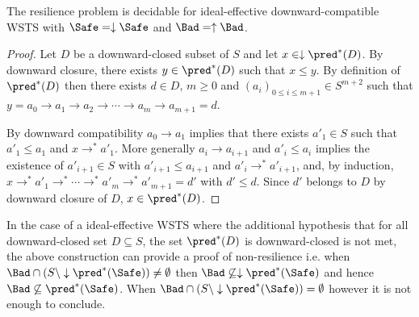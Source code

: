 \begin{corollary}
The resilience problem is decidable for ideal-effective downward-compatible WSTS with 
$\Safe=\downarrow \Safe$
and $\Bad=\uparrow \Bad$.
\end{corollary}

\begin{proof}


Let $D$ be a downward-closed subset of $S$
and let $x \in \downarrow \pred^*(D)$.
By downward closure, there exists
$y \in \pred^*(D)$ 
such that $x \leq y$.
By definition of $\pred^*(D)$ then there exists 
$d \in D$, $m\geq 0$ and $(a_i)_{0 \leq i \leq m+1} \in S^{m+2}$ such that
$y = a_0 \to a_1 \to a_2 \to \cdots \to a_m \to a_{m+1} = d$.

By downward compatibility $a_0 \to a_1$
implies that there exists $a'_1 \in S$ such that $a'_1 \leq a_1$ and
$x \to^* a'_1$.
More generally $a_i \to a_{i+1}$ and
$a'_i\leq a_i$ implies the existence of $a'_{i+1} \in S$ with $a'_{i+1} \leq a_{i+1}$ and
$a'_i \to^* a'_{i+1}$,
and, by induction,
 $x \to^* a'_1 \to^* \cdots \to^* a'_{m} \to^* a'_{m+1} = d'$
with $d' \leq d$.
Since
$d'$ 
belongs to $D$ by downward closure of $D$, $x \in \pred^*(D)$.
\end{proof}

In the case
of a ideal-effective WSTS 
where
the additional hypothesis that
for all downward-closed set $D \subseteq S$, the set $\pred^*(D)$ is downward-closed
is not met,
the above construction
can provide a proof
of non-resilience
i.e. when
$\Bad \cap (S \setminus \downarrow\pred^*(\Safe)) \neq \emptyset$
then
$\Bad \not\subseteq \downarrow\pred^*(\Safe)$
and hence
$\Bad \not\subseteq \pred^*(\Safe)$.
When $\Bad \cap (S \setminus \downarrow\pred^*(\Safe)) = \emptyset$
however
it is not enough to conclude.




